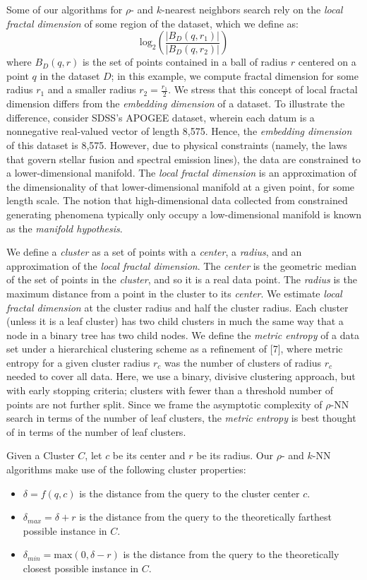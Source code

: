 Some of our algorithms for $\rho$- and $k$-nearest neighbors search rely on the \emph{local fractal dimension} of some region of the dataset, 
which we define as: 
$$\text{log}_2 \left( \frac{|B_D(q, r_1)|}{|B_D(q, r_2)|} \right)$$
where $B_D(q, r)$ is the set of points contained in a ball of radius $r$ 
centered on a point $q$ in the dataset $D$; in this example, we compute fractal dimension for some radius $r_1$ and a smaller radius $r_2 = \frac{r_1}{2}$.
We stress that this concept of local fractal dimension differs from the \emph{embedding dimension} of a dataset. To illustrate the difference,
consider SDSS's APOGEE dataset, wherein each datum is a nonnegative real-valued vector of length 8,575. Hence, the \emph{embedding dimension} of this dataset is 8,575. 
However, due to physical constraints (namely, the laws that govern stellar fusion and spectral emission lines), the data are constrained to a lower-dimensional 
manifold. The \emph{local fractal dimension} is an approximation of the dimensionality of that lower-dimensional manifold at a given point, for some length scale.
The notion that high-dimensional data collected from constrained generating phenomena typically only occupy a low-dimensional manifold is known as the \emph{manifold hypothesis}.


We define a \emph{cluster} as a set of points with a \emph{center}, a \emph{radius}, and an approximation of the \emph{local fractal dimension}.
The \emph{center} is the geometric median of the set of points in the \emph{cluster}, and so it is a real data point. The \emph{radius} is the
maximum distance from a point in the cluster to its \emph{center}. We estimate \emph{local fractal dimension} at the cluster radius and half
the cluster radius. Each cluster (unless it is a leaf cluster) has two child clusters in much the same way that a node in
a binary tree has two child nodes. We define the \emph{metric entropy} of a data set under a hierarchical clustering scheme as a refinement of [7], where
metric entropy for a given cluster radius $r_c$ was the number of clusters of radius $r_c$ needed to cover all data. Here, we use a binary, divisive clustering 
approach, but with early stopping criteria; clusters with fewer than a threshold number of points are not further split. 
Since we frame the asymptotic complexity of $\rho$-NN search in terms of the number of leaf clusters, the \emph{metric entropy} is best thought of in terms of the number of
leaf clusters. 

Given a Cluster $C$, let $c$ be its center and $r$ be its radius. Our $\rho$- and $k$-NN algorithms make use of the following cluster 
properties:
\begin{itemize}
    \item $\delta = f(q, c)$ is the distance from the query to the cluster center $c$.
    \item $\delta_{max} = \delta + r$ is the distance from the query to the theoretically farthest possible instance in $C$.
    \item $\delta_{min} = \text{max}(0, \delta - r)$ is the distance from the query to the theoretically closest possible instance in $C$.
\end{itemize}

